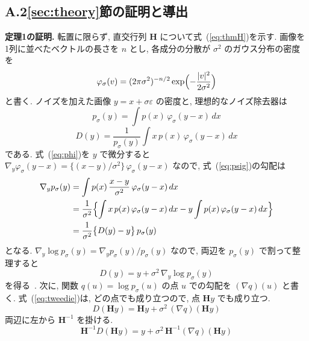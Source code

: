\documentclass[MIRU,submit]{miru2025j}
\newcommand{\Hm}{\mathbf{H}}            %
\renewcommand{\eqref}[1]{(\ref{#1})}
\begin{document}
\subsection*{A.2\quad \ref{sec:theory}節の証明と導出}
\label{sec:supp-proof}
\textbf{定理1の証明.} 転置に限らず, 直交行列 $\Hm$ について式~\eqref{eq:thmH}を示す. 画像を1列に並べたベクトルの長さを $n$ とし, 各成分の分散が $\sigma^{2}$ のガウス分布の密度を
\begin{equation}
\varphi_\sigma(v)=(2\pi\sigma^{2})^{-n/2}\exp\Bigl(-\frac{|v|^{2}}{2\sigma^{2}}\Bigr)
\label{eq:phi}
\end{equation}
と書く. ノイズを加えた画像 $y=x+\sigma\varepsilon$ の密度と, 理想的なノイズ除去器は
\begin{equation}
p_\sigma(y)=\int p(x)\,\varphi_\sigma(y-x)\,dx
\label{eq:psig}
\end{equation}
\begin{equation}
D(y)=\frac{1}{p_\sigma(y)}\int x\,p(x)\,\varphi_\sigma(y-x)\,dx
\label{eq:Dy}
\end{equation}
である. 式~\eqref{eq:phi}を $y$ で微分すると $\nabla_y\varphi_\sigma(y-x)=\{(x-y)/\sigma^{2}\}\,\varphi_\sigma(y-x)$ なので, 式~\eqref{eq:psig}の勾配は
\begin{equation}
\begin{split}
\nabla_y p_\sigma(y)&=\int p(x)\,\frac{x-y}{\sigma^{2}}\,\varphi_\sigma(y-x)\,dx\\
&=\frac{1}{\sigma^{2}}\Bigl\{\int x\,p(x)\,\varphi_\sigma(y-x)\,dx-y\int p(x)\,\varphi_\sigma(y-x)\,dx\Bigr\}\\
&=\frac{1}{\sigma^{2}}\bigl\{D(y)-y\bigr\}\,p_\sigma(y)
\end{split}
\label{eq:gradp}
\end{equation}
となる. $\nabla_y\log p_\sigma(y)=\nabla_y p_\sigma(y)/p_\sigma(y)$ なので, 両辺を $p_\sigma(y)$ で割って整理すると
\begin{equation}
D(y)=y+\sigma^{2}\,\nabla_y\log p_\sigma(y)
\label{eq:tweedie}
\end{equation}
を得る~\cite{efron2011tweedie,vincent2011dsm}. 次に, 関数 $q(u)=\log p_\sigma(u)$ の点 $u$ での勾配を $(\nabla q)(u)$ と書く. 式~\eqref{eq:tweedie}は, どの点でも成り立つので, 点 $\Hm y$ でも成り立つ.
\begin{equation}
D(\Hm y)=\Hm y+\sigma^{2}\,(\nabla q)(\Hm y)
\label{eq:tw2}
\end{equation}
両辺に左から $\Hm^{-1}$ を掛ける.
\begin{equation}
\Hm^{-1}D(\Hm y)=y+\sigma^{2}\,\Hm^{-1}(\nabla q)(\Hm y)
\label{eq:tw3}
\end{equation}
\end{document}
